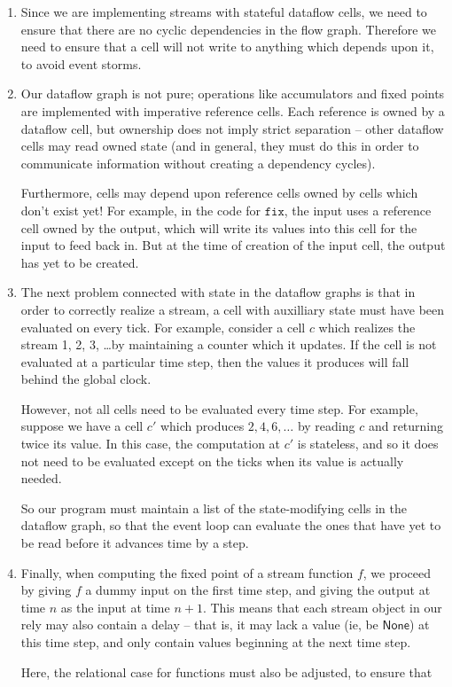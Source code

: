 \documentclass[preprint]{sigplanconf}
\newcommand{\term}[1]{\ensuremath{\mathtt{{#1}}}}
\newcommand{\None}{\mathsf{None}}
\begin{document}
\begin{enumerate}
\item Since we are implementing streams with stateful dataflow 
  cells, we need to ensure that there are no cyclic dependencies 
  in the flow graph. Therefore we need to ensure that a cell will
  not write to anything which depends upon it, to avoid event storms. 

\item Our dataflow graph is not pure; operations like accumulators and
  fixed points are implemented with imperative reference cells.  Each
  reference is owned by a dataflow cell, but ownership does not imply
  strict separation -- other dataflow cells may read owned state (and
  in general, they must do this in order to communicate information
  without creating a dependency cycles).

  Furthermore, cells may depend upon reference cells owned by cells
  which don't exist yet! For example, in the code for \term{fix}, the
  input uses a reference cell owned by the output, which will write
  its values into this cell for the input to feed back in. But at the
  time of creation of the input cell, the output has yet to be
  created.

\item The next problem connected with state in the dataflow graphs is
  that in order to correctly realize a stream, a cell with auxilliary
  state must have been evaluated on every tick. For example, consider
  a cell $c$ which realizes the stream 1, 2, 3, \ldots by maintaining
  a counter which it updates. If the cell is not evaluated at a
  particular time step, then the values it produces will fall behind
  the global clock.

  However, not all cells need to be evaluated every time step. For
  example, suppose we have a cell $c'$ which produces $2, 4, 6,
  \ldots$ by reading $c$ and returning twice its value. In this case,
  the computation at $c'$ is stateless, and so it does not need to be
  evaluated except on the ticks when its value is actually needed.

  So our program must maintain a list of the state-modifying cells in
  the dataflow graph, so that the event loop can evaluate the ones
  that have yet to be read before it advances time by a step.

\item Finally, when computing the fixed point of a stream function
  $f$, we proceed by giving $f$ a dummy input on the first time step,
  and giving the output at time $n$ as the input at time $n+1$. This
  means that each stream object in our rely may also contain a delay
  -- that is, it may lack a value (ie, be $\None$) at this time step,
  and only contain values beginning at the next time step.

  Here, the relational case for functions must also be adjusted, to 
  ensure that 
\end{enumerate}
\end{document}
